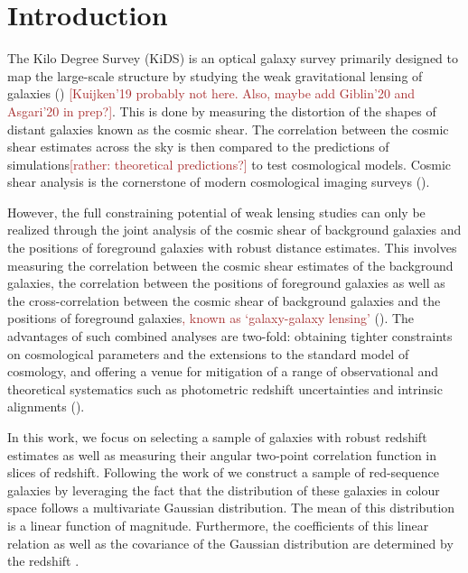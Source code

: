 \documentclass{aa}
\numberwithin{equation}{section}
\newcommand{\mb}{\textcolor{brown}}
\begin{document}

\maketitle


\section{Introduction}

The Kilo Degree Survey (KiDS) is an optical galaxy survey primarily designed to map the large-scale structure by studying the weak gravitational lensing of galaxies (\citealt{kuijken2015, hendrick2017, kuijken2019, hendrik2020}) \mb{[Kuijken'19 probably not here. Also, maybe add Giblin'20 and Asgari'20 in prep?]}. This is done by measuring the distortion of the shapes of distant galaxies known as the cosmic shear. The correlation between the cosmic shear estimates across the sky is then compared to the predictions of simulations\mb{[rather: theoretical predictions?]} to test cosmological models. Cosmic shear analysis is the cornerstone of modern cosmological imaging surveys (\citealt{heymans2013,jee2016,hendrick2017,joudaki2017,troxel2017,joudaki2019, hikage2019}). 

However, the full constraining potential of weak lensing studies can only be realized through the joint analysis of the cosmic shear of background galaxies and the positions of foreground galaxies with robust distance estimates. This involves measuring the correlation between the cosmic shear estimates of the background galaxies, the correlation between the positions of foreground galaxies as well as the cross-correlation between the cosmic shear of background galaxies and the positions of foreground galaxies\mb{, known as `galaxy-galaxy lensing'} (\citealt{cacciato2013, cosmolike, des_y1_cosmology, elvin2017, edo2018, prat2017}). 
The advantages of such combined analyses are two-fold: obtaining tighter constraints on cosmological parameters and the extensions to the standard model of cosmology, and offering a venue for mitigation of a range of observational and theoretical systematics such as photometric redshift uncertainties and intrinsic alignments (\citealt{edo2016, joudaki2018, sam2019}). 

In this work, we focus on selecting a sample of galaxies with robust redshift estimates as well as measuring their angular two-point correlation function in slices of redshift. Following the work of \citet{vakili2019} we construct a sample of red-sequence galaxies by leveraging the fact that the distribution of these galaxies in colour space follows a multivariate Gaussian distribution. The mean of this distribution is a linear function of magnitude. Furthermore, the coefficients of this linear relation as well as the covariance of the Gaussian distribution are determined by the redshift \citep[e.g.][]{bower1992,ellis1997,gladders1998,stanford1998}. 
\end{document}
